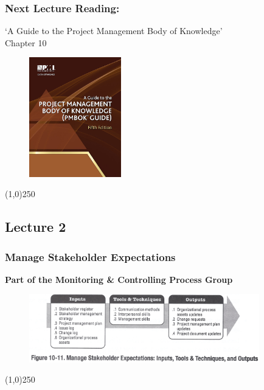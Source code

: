 \begin{frame}
\frametitle{Next Lecture \hfill\hfill Reading:}
`A Guide to the Project Management Body of Knowledge'\\ 
Chapter 10
\begin{figure}[h]
	\centering
		\includegraphics[width = 4cm]{images/book.jpg}
\end{figure}
\end{frame}\begin{center}\line(1,0){250}\end{center}


\subsection{Lecture 2}




\begin{frame}
\frametitle{Manage Stakeholder Expectations}
\textbf{Part of the Monitoring \& Controlling Process Group}
\begin{figure}
	\centering
		\includegraphics[width = 10cm]{images/Fig10-11.jpg}
	\label{fig:10-11}
\end{figure}
\end{frame}\begin{center}\line(1,0){250}\end{center}

